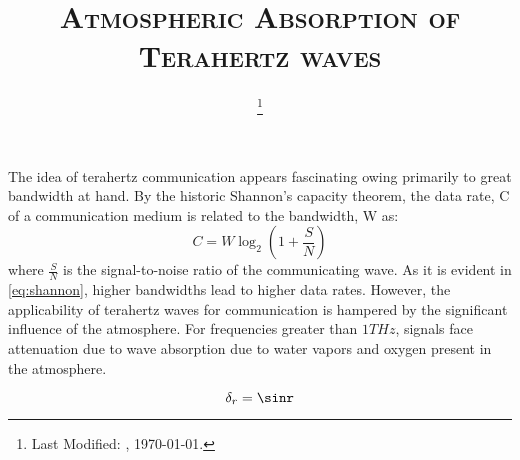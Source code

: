 \documentclass{article}
\begin{document}
  \title{\textsc{Atmospheric Absorption of Terahertz waves}\\}
  \date{\footnote{Last Modified: \currenttime, \today.}}
  \maketitle

  The idea of terahertz communication appears fascinating owing primarily to great bandwidth at hand. By the historic Shannon's capacity theorem, \cite{shannon1949communication} the data rate, C of a communication medium is related to the bandwidth, W as:
  \begin{equation}
    C = W \log_2 \left( 1 + \frac{S}{N} \right )
    \label{eq:shannon}
  \end{equation}
  where $\frac{S}{N}$ is the signal-to-noise ratio of the communicating wave. As it is evident in \ref{eq:shannon}, higher bandwidths lead to higher data rates. However, the applicability of terahertz waves for communication is hampered by the significant influence of the atmosphere. For frequencies greater than $ 1 THz$, signals face attenuation due to wave absorption due to water vapors and oxygen present in the atmosphere\cite{danylov2006thz}.

  
  


\begin{equation}
  \delta_r = \sinr
\end{equation}

  
\end{document}
